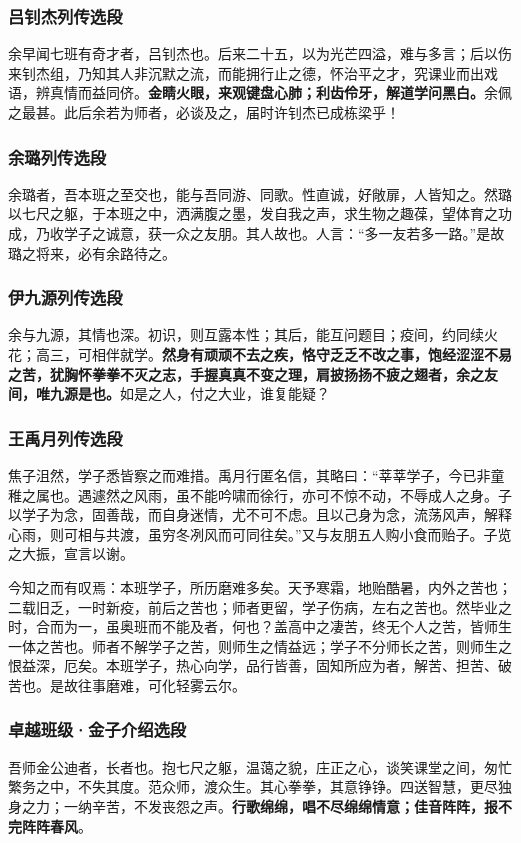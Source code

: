 \documentclass[a5paper]{ctexart}
\begin{document}
	\subsubsection{吕钊杰列传选段}
	余早闻七班有奇才者，吕钊杰也。后来二十五，以为光芒四溢，难与多言；后以伤来钊杰组，乃知其人非沉默之流，而能拥行止之德，怀治平之才，究课业而出戏语，辨真情而益同侪。\textbf{金睛火眼，来观键盘心肺；利齿伶牙，解道学问黑白。}余佩之最甚。此后余若为师者，必谈及之，届时许钊杰已成栋梁乎！
	
	\subsubsection{余璐列传选段}
	余璐者，吾本班之至交也，能与吾同游、同歌。性直诚，好敞扉，人皆知之。然璐以七尺之躯，于本班之中，洒满腹之墨，发自我之声，求生物之趣葆，望体育之功成，乃收学子之诚意，获一众之友朋。其人故也。人言：“多一友若多一路。”是故璐之将来，必有余路待之。
	
	\subsubsection{伊九源列传选段}
	余与九源，其情也深。初识，则互露本性；其后，能互问题目；疫间，约同续火花；高三，可相伴就学。\textbf{然身有顽顽不去之疾，恪守乏乏不改之事，饱经涩涩不易之苦，犹胸怀拳拳不灭之志，手握真真不变之理，肩披扬扬不疲之翅者，余之友间，唯九源是也。}如是之人，付之大业，谁复能疑？
	
	\subsubsection{王禹月列传选段}
	焦子沮然，学子悉皆察之而难措。禹月行匿名信，其略曰：“莘莘学子，今已非童稚之属也。遇遽然之风雨，虽不能吟啸而徐行，亦可不惊不动，不辱成人之身。子以学子为念，固善哉，而自身迷情，尤不可不虑。且以己身为念，流荡风声，解释心雨，则可相与共渡，虽穷冬冽风而可同往矣。”又与友朋五人购小食而贻子。子览之大振，宣言以谢。
	
	今知之而有叹焉：本班学子，所历磨难多矣。天予寒霜，地贻酷暑，内外之苦也；二载旧乏，一时新疫，前后之苦也；师者更留，学子伤病，左右之苦也。然毕业之时，合而为一，虽奥班而不能及者，何也？盖高中之凄苦，终无个人之苦，皆师生一体之苦也。师者不解学子之苦，则师生之情益远；学子不分师长之苦，则师生之恨益深，厄矣。本班学子，热心向学，品行皆善，固知所应为者，解苦、担苦、破苦也。是故往事磨难，可化轻雾云尔。
	
	\subsubsection{卓越班级·金子介绍选段}
	吾师金公迪者，长者也。抱七尺之躯，温蔼之貌，庄正之心，谈笑课堂之间，匆忙繁务之中，不失其度。范众师，渡众生。其心拳拳，其意铮铮。四送智慧，更尽独身之力；一纳辛苦，不发丧怨之声。\textbf{行歌绵绵，唱不尽绵绵情意；佳音阵阵，报不完阵阵春风}。
	
\end{document}
